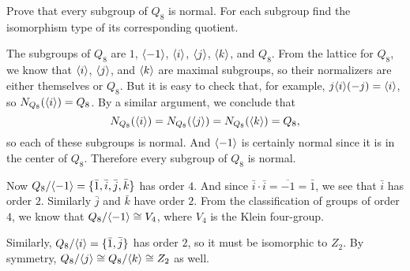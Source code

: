  Prove that every subgroup of $Q_8$ is normal. For each
subgroup find the isomorphism type of its corresponding quotient.
\begin{solution}
  The subgroups of $Q_8$ are $1$, $\langle{-1}\rangle$, $\langle{i}\rangle$, $\langle{j}\rangle$,
  $\langle{k}\rangle$, and $Q_8$. From the lattice for $Q_8$, we know that
  $\langle{i}\rangle$, $\langle{j}\rangle$, and $\langle{k}\rangle$ are maximal subgroups, so their
  normalizers are either themselves or $Q_8$. But it is easy to check
  that, for example, $j\langle{i}\rangle(-j) = \langle{i}\rangle$, so
  $N_{Q_8}(\langle{i}\rangle) = Q_8$. By a similar argument, we conclude that
  \begin{equation*}
    N_{Q_8}(\langle{i}\rangle) = N_{Q_8}(\langle{j}\rangle) = N_{Q_8}(\langle{k}\rangle) = Q_8,
  \end{equation*}
  so each of these subgroups is normal. And $\langle{-1}\rangle$ is certainly
  normal since it is in the center of $Q_8$. Therefore every subgroup
  of $Q_8$ is normal.

  Now $Q_8/\langle{-1}\rangle = \{\bar1, \bar i, \bar j, \bar k\}$ has order
  $4$. And since $\bar{i}\cdot\bar{i} = \overline{-1} = \bar1$, we see
  that $\bar{i}$ has order $2$. Similarly $\bar{j}$ and $\bar{k}$ have
  order $2$. From the classification of groups of order $4$, we know
  that $Q_8/\langle{-1}\rangle\cong V_4$, where $V_4$ is the Klein four-group.

  Similarly, $Q_8/\langle{i}\rangle = \{\bar1, \bar{j}\}$ has order $2$, so it
  must be isomorphic to $Z_2$. By symmetry,
  $Q_8/\langle{j}\rangle\cong Q_8/\langle{k}\rangle\cong Z_2$ as well.
\end{solution}

